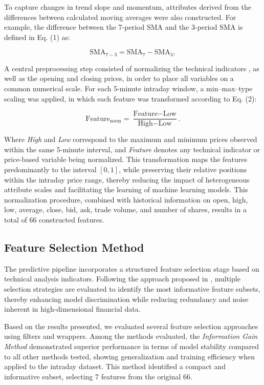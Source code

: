 \documentclass[conference]{IEEEtran}
\begin{document}
To capture changes in trend slope and momentum, attributes derived from the differences between calculated moving averages were also constructed. For example, the difference between the 7-period SMA and the 3-period SMA is defined in Eq. (1) as:

\begin{equation}
\text{SMA}_{7-3} = \text{SMA}_{7} - \text{SMA}_{3},
\end{equation}

A central preprocessing step consisted of normalizing the technical indicators \cite{singh2022feature}, as well as the opening and closing prices, in order to place all variables on a common numerical scale. For each 5-minute intraday window, a min–max–type scaling was applied, in which each feature was transformed according to Eq. (2):

\begin{equation}
\text{Feature}_{\text{norm}} = \frac{\text{Feature} - \text{Low}}{\text{High} - \text{Low}}.
\end{equation}

Where \textit{High} and \textit{Low} correspond to the maximum and minimum prices observed within the same 5-minute interval, and \textit{Feature} denotes any technical indicator or price-based variable being normalized. This transformation maps the features predominantly to the interval $[0,1]$, while preserving their relative positions within the intraday price range, thereby reducing the impact of heterogeneous attribute scales and facilitating the learning of machine learning models. This normalization procedure, combined with historical information on open, high, low, average, close, bid, ask, trade volume, and number of shares, results in a total of 66 constructed features.

\subsection{Feature Selection Method}
\label{sec:Feature Selection}
The predictive pipeline incorporates a structured feature selection stage based on technical analysis indicators. Following the approach proposed in \cite{souza2024dataset}, multiple selection strategies are evaluated to identify the most informative feature subsets, thereby enhancing model discrimination while reducing redundancy and noise inherent in high-dimensional financial data.

Based on the results presented, we evaluated several feature selection approaches using filters and wrappers. Among the methods evaluated, the \textit{Information Gain Method }\cite{lei2012feature} demonstrated superior performance in terms of model stability compared to all other methods tested, showing generalization and training efficiency when applied to the %
intraday dataset. This method identified a compact and informative subset, selecting 7 features from the original 66.
\end{document}

